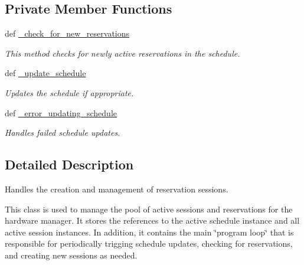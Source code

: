 \subsection*{Private Member Functions}
\begin{DoxyCompactItemize}
\item 
def \hyperlink{classhwm_1_1sessions_1_1coordinator_1_1_session_coordinator_aef6d481d9ca119603248bd9cca6947a5}{\-\_\-check\-\_\-for\-\_\-new\-\_\-reservations}
\begin{DoxyCompactList}\small\item\em This method checks for newly active reservations in the schedule. \end{DoxyCompactList}\item 
def \hyperlink{classhwm_1_1sessions_1_1coordinator_1_1_session_coordinator_ae7a9f10d228a8c662cc2f6d0b18f1bd9}{\-\_\-update\-\_\-schedule}
\begin{DoxyCompactList}\small\item\em Updates the schedule if appropriate. \end{DoxyCompactList}\item 
def \hyperlink{classhwm_1_1sessions_1_1coordinator_1_1_session_coordinator_a6b992f2cb78b711cb2e6388d74b8fe26}{\-\_\-error\-\_\-updating\-\_\-schedule}
\begin{DoxyCompactList}\small\item\em Handles failed schedule updates. \end{DoxyCompactList}\end{DoxyCompactItemize}


\subsection{Detailed Description}
Handles the creation and management of reservation sessions. 

This class is used to manage the pool of active sessions and reservations for the hardware manager. It stores the references to the active schedule instance and all active session instances. In addition, it contains the main \char`\"{}program loop\char`\"{} that is responsible for periodically trigging schedule updates, checking for reservations, and creating new sessions as needed. 


